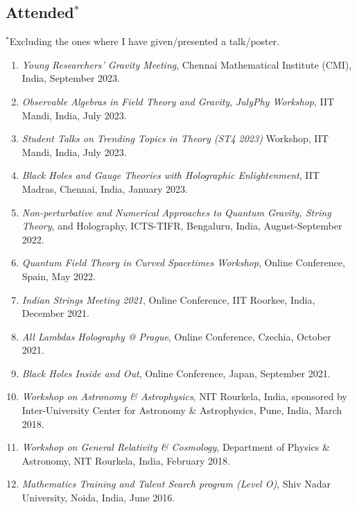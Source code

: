\documentclass[11pt, letterpaper]{article}
\begin{document}
	\subsection{Attended$^*$}
	$^*$Excluding the ones where I have given/presented a talk/poster.
	\begin{enumerate}
		\item \textit{Young Researchers' Gravity Meeting}, Chennai Mathematical Institute (CMI), India, September 2023.
		
		\item \textit{Observable Algebras in Field Theory and Gravity}, \textit{JulyPhy Workshop}, IIT Mandi, India, July 2023.
		
		\item \textit{Student Talks on Trending Topics in Theory (ST4 2023)} Workshop, IIT Mandi, India, July 2023.
		
		\item \textit{Black Holes and Gauge Theories with Holographic Enlightenment}, IIT Madras, Chennai, India, January 2023.
		
		\item \textit{Non-perturbative and Numerical Approaches to Quantum Gravity, String Theory}, and Holography, ICTS-TIFR, Bengaluru, India, August-September 2022.

		\item \textit{Quantum Field Theory in Curved Spacetimes Workshop}, Online Conference, Spain, May 2022.

		\item \textit{Indian Strings Meeting 2021}, Online Conference, IIT Roorkee, India, December 2021.

		\item \textit{All Lambdas Holography @ Prague}, Online Conference, Czechia, October 2021.

		\item \textit{Black Holes Inside and Out}, Online Conference, Japan, September 2021.

		\item\textit{Workshop on Astronomy \& Astrophysics}, NIT Rourkela, India, sponsored by Inter-University Center for Astronomy \& Astrophysics, Pune, India, March 2018.

		\item \textit{Workshop on General Relativity \& Cosmology}, Department of Physics \& Astronomy, NIT Rourkela, India, February 2018.

		\item \textit{Mathematics Training and Talent Search program (Level O)}, Shiv Nadar University, Noida, India, June 2016.
	\end{enumerate}
\end{document}
